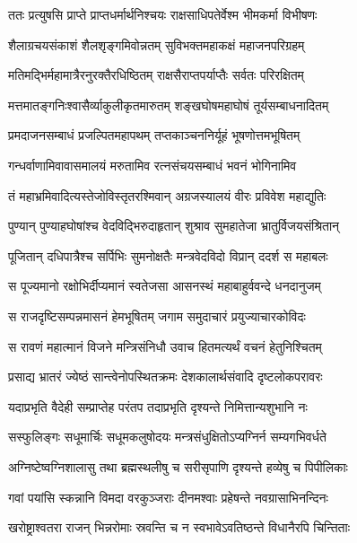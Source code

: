 
\twolineshloka
{ततः प्रत्युषसि प्राप्ते प्राप्तधर्मार्थनिश्चयः}
{राक्षसाधिपतेर्वेश्म भीमकर्मा विभीषणः} %

\twolineshloka
{शैलाग्रचयसंकाशं शैलशृङ्गमिवोन्नतम्}
{सुविभक्तमहाकक्षं महाजनपरिग्रहम्} %

\twolineshloka
{मतिमद्भिर्महामात्रैरनुरक्तैरधिष्ठितम्}
{राक्षसैराप्तपर्याप्तैः सर्वतः परिरक्षितम्} %

\twolineshloka
{मत्तमातङ्गनिःश्वासैर्व्याकुलीकृतमारुतम्}
{शङ्खघोषमहाघोषं तूर्यसम्बाधनादितम्} %

\twolineshloka
{प्रमदाजनसम्बाधं प्रजल्पितमहापथम्}
{तप्तकाञ्चननिर्यूहं भूषणोत्तमभूषितम्} %

\twolineshloka
{गन्धर्वाणामिवावासमालयं मरुतामिव}
{रत्नसंचयसम्बाधं भवनं भोगिनामिव} %

\twolineshloka
{तं महाभ्रमिवादित्यस्तेजोविस्तृतरश्मिवान्}
{अग्रजस्यालयं वीरः प्रविवेश महाद्युतिः} %

\twolineshloka
{पुण्यान् पुण्याहघोषांश्च वेदविद्भिरुदाहृतान्}
{शुश्राव सुमहातेजा भ्रातुर्विजयसंश्रितान्} %

\twolineshloka
{पूजितान् दधिपात्रैश्च सर्पिभिः सुमनोक्षतैः}
{मन्त्रवेदविदो विप्रान् ददर्श स महाबलः} %

\twolineshloka
{स पूज्यमानो रक्षोभिर्दीप्यमानं स्वतेजसा}
{आसनस्थं महाबाहुर्ववन्दे धनदानुजम्} %

\twolineshloka
{स राजदृष्टिसम्पन्नमासनं हेमभूषितम्}
{जगाम समुदाचारं प्रयुज्याचारकोविदः} %

\twolineshloka
{स रावणं महात्मानं विजने मन्त्रिसंनिधौ}
{उवाच हितमत्यर्थं वचनं हेतुनिश्चितम्} %

\twolineshloka
{प्रसाद्य भ्रातरं ज्येष्ठं सान्त्वेनोपस्थितक्रमः}
{देशकालार्थसंवादि दृष्टलोकपरावरः} %

\twolineshloka
{यदाप्रभृति वैदेही सम्प्राप्तेह परंतप}
{तदाप्रभृति दृश्यन्ते निमित्तान्यशुभानि नः} %

\twolineshloka
{सस्फुलिङ्गः सधूमार्चिः सधूमकलुषोदयः}
{मन्त्रसंधुक्षितोऽप्यग्निर्न सम्यगभिवर्धते} %

\twolineshloka
{अग्निष्टेष्वग्निशालासु तथा ब्रह्मस्थलीषु च}
{सरीसृपाणि दृश्यन्ते हव्येषु च पिपीलिकाः} %

\twolineshloka
{गवां पयांसि स्कन्नानि विमदा वरकुञ्जराः}
{दीनमश्वाः प्रहेषन्ते नवग्रासाभिनन्दिनः} %

\twolineshloka
{खरोष्ट्राश्वतरा राजन् भिन्नरोमाः स्रवन्ति च}
{न स्वभावेऽवतिष्ठन्ते विधानैरपि चिन्तिताः} %

